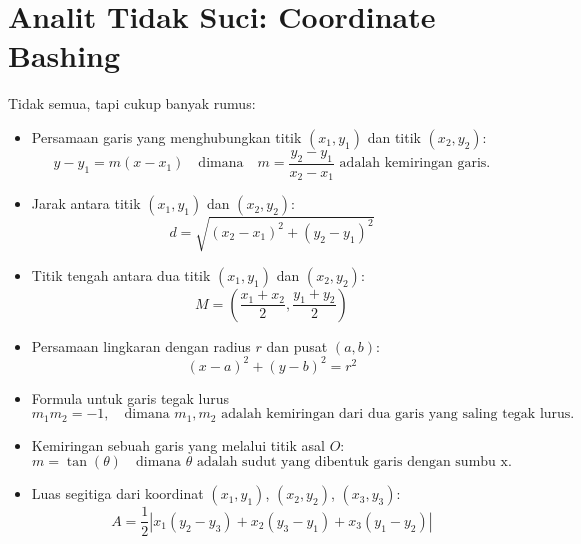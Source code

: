 \documentclass[11pt]{scrartcl}
\begin{document}
\section{Analit Tidak Suci: Coordinate Bashing}
Tidak semua, tapi cukup banyak rumus:
\begin{itemize}
    \item Persamaan garis yang menghubungkan titik $(x_1, y_1)$ dan titik $(x_2, y_2)$:
    \[ y - y_1 = m(x - x_1) \quad \text{dimana} \quad m = \frac{y_2 - y_1}{x_2 - x_1} \text{ adalah kemiringan garis.} \]
    
    \item Jarak antara titik $(x_1, y_1)$ dan $(x_2, y_2)$:
    \[ d = \sqrt{(x_2 - x_1)^2 + (y_2 - y_1)^2} \]
    
    \item Titik tengah antara dua titik $(x_1, y_1)$ dan $(x_2, y_2)$:
    \[ M = \left(\frac{x_1 + x_2}{2}, \frac{y_1 + y_2}{2}\right) \]
    
    \item Persamaan lingkaran dengan radius $r$ dan pusat $(a, b)$:
    \[ (x - a)^2 + (y - b)^2 = r^2 \]
    
    \item Formula untuk garis tegak lurus
    \[ m_1m_2 = -1, \quad \text{dimana } m_1, m_2 \text{ adalah kemiringan dari dua garis yang saling tegak lurus.} \]
    
    \item Kemiringan sebuah garis yang melalui titik asal $O$:
    \[ m = \tan(\theta) \quad \text{dimana } \theta \text{ adalah sudut yang dibentuk garis dengan sumbu x.} \]
    
    \item Luas segitiga dari koordinat $(x_1, y_1)$, $(x_2, y_2)$, $(x_3, y_3)$:
    \[ A = \frac{1}{2} 
    \left| 
    x_1(y_2 - y_3) + x_2(y_3 - y_1) + x_3(y_1 - y_2) 
    \right| \]
\end{itemize}
\end{document}
